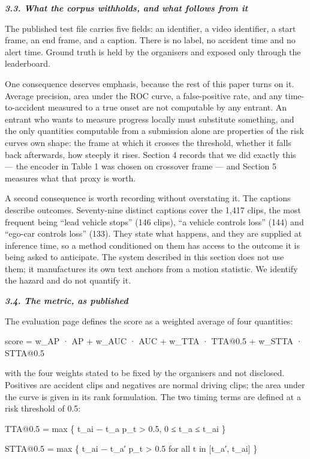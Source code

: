 \emph{\textbf{3.3. What the corpus withholds, and what follows from it}}

The published test file carries five fields: an identifier, a video identifier, a start frame, an end frame, and a caption. There is no label, no accident time and no alert time. Ground truth is held by the organisers and exposed only through the leaderboard.

One consequence deserves emphasis, because the rest of this paper turns on it. Average precision, area under the ROC curve, a false-positive rate, and any time-to-accident measured to a true onset are not computable by any entrant. An entrant who wants to measure progress locally must substitute something, and the only quantities computable from a submission alone are properties of the risk curve\textquotesingle s own shape: the frame at which it crosses the threshold, whether it falls back afterwards, how steeply it rises. Section 4 records that we did exactly this --- the encoder in Table 1 was chosen on crossover frame --- and Section 5 measures what that proxy is worth.

A second consequence is worth recording without overstating it. The captions describe outcomes. Seventy-nine distinct captions cover the 1,417 clips, the most frequent being ``lead vehicle stops'' (146 clips), ``a vehicle controls loss'' (144) and ``ego-car controls loss'' (133). They state what happens, and they are supplied at inference time, so a method conditioned on them has access to the outcome it is being asked to anticipate. The system described in this section does not use them; it manufactures its own text anchors from a motion statistic. We identify the hazard and do not quantify it.

\emph{\textbf{3.4. The metric, as published}}

The evaluation page defines the score as a weighted average of four quantities:

score = w\_AP · AP + w\_AUC · AUC + w\_TTA · TTA@0.5 + w\_STTA · STTA@0.5

with the four weights stated to be fixed by the organisers and not disclosed. Positives are accident clips and negatives are normal driving clips; the area under the curve is given in its rank formulation. The two timing terms are defined at a risk threshold of 0.5:

TTA@0.5 = max \{ t\_ai − t\_a \textbar{} p\_t \textgreater{} 0.5, 0 ≤ t\_a ≤ t\_ai \}

STTA@0.5 = max \{ t\_ai − t\_a′ \textbar{} p\_t \textgreater{} 0.5 for all t in {[}t\_a′, t\_ai{]} \}

